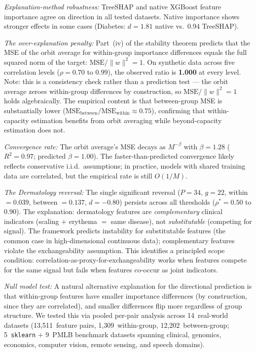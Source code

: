 \documentclass[11pt,a4paper]{article}
\begin{document}
\emph{Explanation-method robustness:} TreeSHAP and native XGBoost feature importance agree on direction in all tested datasets.  Native importance shows stronger effects in some cases (Diabetes: $d = 1.81$ native vs.\ 0.94 TreeSHAP).

\emph{The over-explanation penalty:} Part~(iv) of the stability theorem predicts that the MSE of the orbit average for within-group importance differences equals the full squared norm of the target: $\text{MSE}/\|w\|^2 = 1$.  On synthetic data across five correlation levels ($\rho = 0.70$ to $0.99$), the observed ratio is \textbf{1.000} at every level.  Note: this is a consistency check rather than a prediction test --- the orbit average zeroes within-group differences by construction, so $\text{MSE}/\|w\|^2 = 1$ holds algebraically.  The empirical content is that between-group MSE is substantially lower ($\text{MSE}_{\text{between}} / \text{MSE}_{\text{within}} \approx 0.75$), confirming that within-capacity estimation benefits from orbit averaging while beyond-capacity estimation does not.

\emph{Convergence rate:} The orbit average's MSE decays as $M^{-\beta}$ with $\beta = 1.28$ ($R^2 = 0.97$; predicted $\beta = 1.00$).  The faster-than-predicted convergence likely reflects conservative i.i.d.\ assumptions; in practice, models with shared training data are correlated, but the empirical rate is still $O(1/M)$.

\emph{The Dermatology reversal:} The single significant reversal ($P = 34$, $g = 22$, within $= 0.039$, between $= 0.137$, $d = -0.80$) persists across all thresholds ($\rho^* = 0.50$ to $0.90$).  The explanation: dermatology features are \emph{complementary} clinical indicators (scaling $+$ erythema $=$ same disease), not \emph{substitutable} (competing for signal).  The framework predicts instability for substitutable features (the common case in high-dimensional continuous data); complementary features violate the exchangeability assumption.  This identifies a principled scope condition: correlation-as-proxy-for-exchangeability works when features compete for the same signal but fails when features co-occur as joint indicators.

\emph{Null model test:} A natural alternative explanation for the directional prediction is that within-group features have smaller importance differences (by construction, since they are correlated), and smaller differences flip more regardless of group structure.  We tested this via pooled per-pair analysis across 14~real-world datasets (13{,}511~feature pairs, 1{,}309~within-group, 12{,}202~between-group; 5~\texttt{sklearn} $+$ 9~PMLB benchmark datasets spanning clinical, genomics, economics, computer vision, remote sensing, and speech domains).
\end{document}
